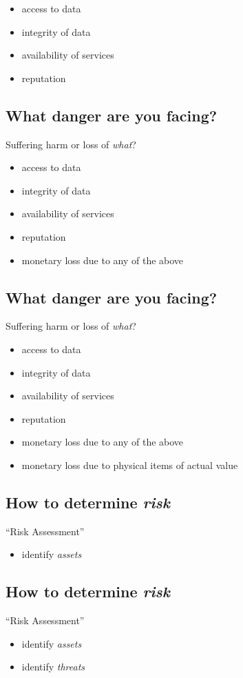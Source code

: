 \documentclass[xga]{xdvislides}
\begin{document}
\begin{itemize}
	\item access to data
	\item integrity of data
	\item availability of services
	\item reputation
\end{itemize}

\subsection{What danger are you facing?}
Suffering harm or loss of {\em what}?

\begin{itemize}
	\item access to data
	\item integrity of data
	\item availability of services
	\item reputation
	\item monetary loss due to any of the above
\end{itemize}

\subsection{What danger are you facing?}
Suffering harm or loss of {\em what}?

\begin{itemize}
	\item access to data
	\item integrity of data
	\item availability of services
	\item reputation
	\item monetary loss due to any of the above
	\item monetary loss due to physical items of actual value
\end{itemize}

\subsection{How to determine {\em risk}}
``Risk Assessment''
\begin{itemize}
	\item identify {\em assets}
\end{itemize}

\subsection{How to determine {\em risk}}
``Risk Assessment''
\begin{itemize}
	\item identify {\em assets}
	\item identify {\em threats}
\end{itemize}
\end{document}
